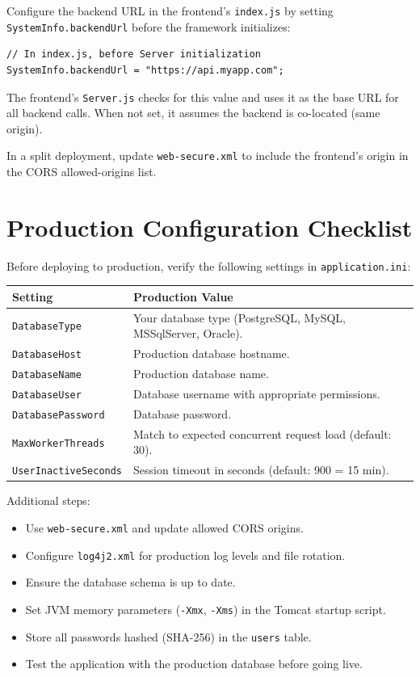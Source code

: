 Configure the backend URL in the frontend's \texttt{index.js} by setting \texttt{SystemInfo.backendUrl} before the framework initializes:

\begin{lstlisting}[style=javascript]
// In index.js, before Server initialization
SystemInfo.backendUrl = "https://api.myapp.com";
\end{lstlisting}

\noindent
The frontend's \texttt{Server.js} checks for this value and uses it as the base URL for all backend calls.  When not set, it assumes the backend is co-located (same origin).

\begin{notebox}
In a split deployment, update \texttt{web-secure.xml} to include the frontend's origin in the CORS allowed-origins list.
\end{notebox}

\section{Production Configuration Checklist}
\label{sec:deploy-checklist}

Before deploying to production, verify the following settings in \texttt{application.ini}:

\begin{longtable}{P{4.5cm}P{6cm}}
\toprule
\textbf{Setting} & \textbf{Production Value} \\
\midrule
\endhead
\texttt{DatabaseType} & Your database type (PostgreSQL, MySQL, MSSqlServer, Oracle). \\
\texttt{DatabaseHost} & Production database hostname. \\
\texttt{DatabaseName} & Production database name. \\
\texttt{DatabaseUser} & Database username with appropriate permissions. \\
\texttt{DatabasePassword} & Database password. \\
\texttt{MaxWorkerThreads} & Match to expected concurrent request load (default: 30). \\
\texttt{UserInactiveSeconds} & Session timeout in seconds (default: 900 = 15 min). \\
\bottomrule
\end{longtable}

\noindent
Additional steps:

\begin{itemize}
  \item Use \texttt{web-secure.xml} and update allowed CORS origins.
  \item Configure \texttt{log4j2.xml} for production log levels and file rotation.
  \item Ensure the database schema is up to date.
  \item Set JVM memory parameters (\texttt{-Xmx}, \texttt{-Xms}) in the Tomcat startup script.
  \item Store all passwords hashed (SHA-256) in the \texttt{users} table.
  \item Test the application with the production database before going live.
\end{itemize}

